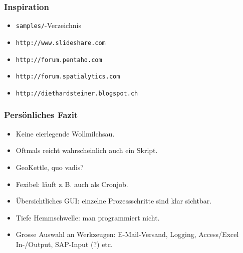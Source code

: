 \documentclass{beamer}
\begin{document}
\begin{frame}
  \frametitle{Inspiration}
  \begin{itemize}
  \item \texttt{samples/}-Verzeichnis
  \item \texttt{http://www.slideshare.com}
  \item \texttt{http://forum.pentaho.com}
  \item \texttt{http://forum.spatialytics.com}
  \item \texttt{http://diethardsteiner.blogspot.ch}
 \end{itemize}
\end{frame}

\begin{frame}
  \frametitle{Persönliches Fazit}
  \begin{itemize}
  \item Keine eierlegende Wollmilchsau.
  \item Oftmals reicht wahrscheinlich auch ein Skript.
  \item GeoKettle, quo vadis?
 \end{itemize}
  \begin{itemize}
  \item Fexibel: läuft z.\,B. auch als Cronjob.
  \item Übersichtliches GUI: einzelne Prozessschritte sind klar sichtbar.
  \item Tiefe Hemmschwelle: man programmiert nicht.
  \item Grosse Auswahl an Werkzeugen: E-Mail-Versand, Logging, Access/Excel In-/Output, SAP-Input (?) etc.
 \end{itemize}
\end{frame}
\end{document}
